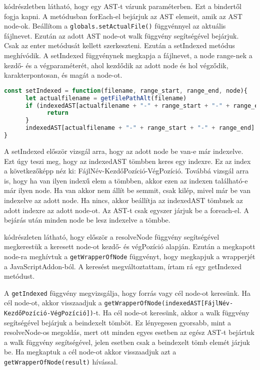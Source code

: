  kódrészletben látható, hogy egy AST-t várunk paraméterben. Ezt a bindertől fogja kapni.
A metódusban forEach-el bejárjuk az AST elemeit, amik az AST node-ok.
Beállítom a \texttt{globals.setActualFile()} függvénnyel az aktuális fájlnevet.
Ezután az adott AST node-ot walk függvény segítségével bejárjuk.
Csak az enter metódusát kellett szerkeszteni.
Ezután a setIndexed metódus meghívódik.
A setIndexed függvénynek megkapja a fájlnevet, a node range-nek a kezdő- és a végparaméterét, ahol kezdődik az adott node és hol végződik, karakterpontosan, és magát a node-ot.

\begin{lstlisting}[caption={setIndexed metódus}, label={lst:setIndexed_function}, language={JavaScript}]
const setIndexed = function(filename, range_start, range_end, node){
      let actualfilename = getFilePathAlt(filename)
      if (indexedAST[actualfilename + "-" + range_start + "-" + range_end] !== undefined && indexedAST[actualfilename + "-" + range_start + "-" + range_end] !== node){
            return
      }
      indexedAST[actualfilename + "-" + range_start + "-" + range_end] = node
}
\end{lstlisting}

A setIndexed először vizsgál arra, hogy az adott node be van-e már indexelve.
Ezt úgy teszi meg, hogy az indexedAST tömbben keres egy indexre.
Ez az index a következőképp néz ki: FájlNév-KezdőPozíció-VégPozíció.
Továbbá vizsgál arra is, hogy ha van ilyen indexű elem a tömbben, akkor ezen az indexen található-e már ilyen node.
Ha van akkor nem állít be semmit, csak kilép, mivel már be van indexelve az adott node. Ha nincs, akkor beállítja az indexedAST tömbnek az adott indexre az adott node-ot.
Az AST-t csak egyszer járjuk be a foreach-el. A bejárás után minden node be lesz indexelve a tömbbe.

\noindent

 kódrészleten látható, hogy először a resolveNode függvény segítségével megkerestük a keresett node-ot kezdő- és végPozíció alapján.
Ezután a megkapott node-ra meghívtuk a \texttt{getWrapperOfNode} függvényt, hogy megkapjuk a wrapperjét a JavaScriptAddon-ból.
A keresést megváltoztattam, írtam rá egy getIndexed metódust.

\noindent

A \texttt{getIndexed} függvény megvizsgálja, hogy forrás vagy cél node-ot keresünk.
Ha cél node-ot, akkor visszaadjuk a \texttt{getWrapperOfNode(indexedAST[FájlNév-KezdőPozíció-VégPozíció])}-t.
Ha cél node-ot keresünk, akkor a walk függvény segítségével bejárjuk a beindexelt tömböt.
Ez lényegesen gyorsabb, mint a resolveNode-os megoldás, mert ott minden egyes esetben az egész AST-t bejártuk a walk függvény segítségével, jelen esetben csak a beindexelt tömb elemét járjuk be.
Ha megkaptuk a cél node-ot akkor visszaadjuk azt a \texttt{getWrapperOfNode(result)} hívással.

